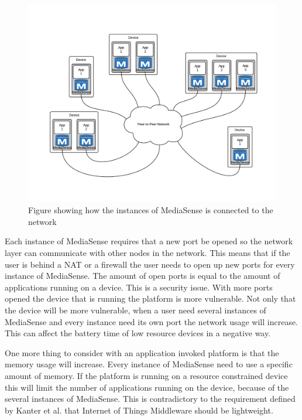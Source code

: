 \begin{figure}[t]
	\centering
    	\includegraphics[scale=0.25]{part_2/mediasense/several_nodes_on_one_device.png}
		\caption{Figure showing how the instances of MediaSense is connected to the network} 
\end{figure}

Each instance of MediaSense requires that a new port be opened so the network layer can communicate with other nodes in the network. This means that if the user is behind a NAT or a firewall the user needs to open up new ports for every instance of MediaSense. The amount of open ports is equal to the amount of applications running on a device. This is a security issue. With more ports opened the device that is running the platform is more vulnerable. Not only that the device will be more vulnerable, when a user need several instances of MediaSense and every instance need its own port the network usage will increase. This can affect the battery time of low resource devices in a negative way.

One more thing to consider with an application invoked platform is that the memory usage will increase. Every instance of MediaSense need to use a specific amount of memory. If the platform is running on a resource constrained device this will limit the number of applications running on the device, because of the several instances of MediaSense. This is contradictory to the requirement defined by Kanter et al. \cite{Kanter539187} that Internet of Things Middleware should be lightweight.

